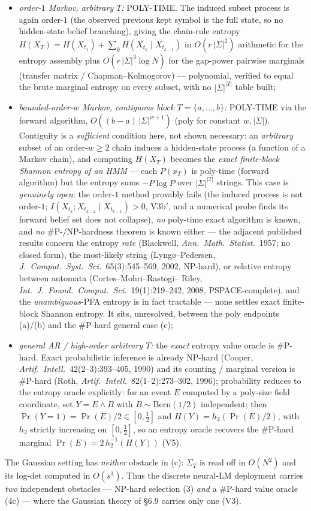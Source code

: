 \documentclass[
]{article}
\begin{document}
\begin{enumerate}
\begin{itemize}
\item[(a)] \emph{order-$1$ Markov, arbitrary $T$:} POLY-TIME. The induced
subset process is again order-$1$ (the observed previous kept symbol is the
full state, so no hidden-state belief branching), giving the chain-rule
entropy $H(X_T)=H(X_{t_1})+\sum_k H(X_{t_k}\mid X_{t_{k-1}})$ in $O(r\,
|\Sigma|^2)$ arithmetic for the entropy assembly plus $O(r\,|\Sigma|^3\log N)$
for the gap-power pairwise marginals (transfer matrix / Chapman--Kolmogorov)
--- polynomial, verified to equal the brute marginal entropy on
every subset, with no $|\Sigma|^{|T|}$ table built;
\item[(b)] \emph{bounded-order-$w$ Markov, \emph{contiguous} block
$T=\{a,\dots,b\}$:} POLY-TIME via the forward algorithm,
$O((b-a)\,|\Sigma|^{w+1})$ (poly for constant $w,|\Sigma|$). Contiguity is a
\emph{sufficient} condition here, not shown necessary: an \emph{arbitrary}
subset of an order-$w\ge 2$ chain induces a hidden-state process (a function of
a Markov chain), and computing $H(X_T)$ becomes the \emph{exact finite-block
Shannon entropy of an HMM} --- each $P(x_T)$ is poly-time (forward algorithm)
but the entropy sums $-P\log P$ over $|\Sigma|^{|T|}$ strings. This case is
\emph{genuinely open}: the order-$1$ method provably fails (the induced process
is not order-$1$; $I(X_{t_k};X_{t_{k-2}}\mid X_{t_{k-1}})>0$, V3b$'$, and a
numerical probe finds its forward belief set does not collapse), \emph{no}
poly-time exact algorithm is known, and \emph{no} \#P-/NP-hardness theorem is
known either --- the adjacent published results concern the entropy \emph{rate}
(Blackwell, \emph{Ann.\ Math.\ Statist.}\ 1957; no closed form), the most-likely
string (Lyng\o{}--Pedersen, \emph{J.\ Comput.\ Syst.\ Sci.}\ 65(3):545--569,
2002, NP-hard), or relative entropy between automata (Cortes--Mohri--Rastogi--
Riley, \emph{Int.\ J.\ Found.\ Comput.\ Sci.}\ 19(1):219--242, 2008,
PSPACE-complete), and the \emph{unambiguous}-PFA entropy is in fact tractable
--- none settles exact finite-block Shannon entropy. It sits, unresolved,
between the poly endpoints (a)/(b) and the \#P-hard general case (c);
\item[(c)] \emph{general AR / high-order arbitrary $T$:} the \emph{exact}
entropy value oracle is \#P-hard. Exact probabilistic inference is already NP-hard (Cooper,
\emph{Artif.\ Intell.}\ 42(2--3):393--405, 1990) and its counting / marginal
version is \#P-hard (Roth, \emph{Artif.\ Intell.}\ 82(1--2):273--302, 1996);
probability reduces to the entropy oracle explicitly: for an
event $E$ computed by a poly-size field coordinate, set $Y=E\wedge B$ with
$B\sim\mathrm{Bern}(1/2)$ independent; then $\Pr(Y{=}1)=\Pr(E)/2\in[0,\tfrac12]$
and $H(Y)=h_2(\Pr(E)/2)$, with $h_2$ strictly increasing on $[0,\tfrac12]$,
so an entropy oracle recovers the \#P-hard marginal $\Pr(E)=2\,h_2^{-1}(H(Y))$
(V5).
\end{itemize}
The Gaussian setting has \emph{neither} obstacle in (c): $\Sigma_T$ is read
off in $O(N^2)$ and its log-det computed in $O(s^3)$. Thus the discrete
neural-LM deployment carries \emph{two} independent obstacles --- NP-hard
selection (3) \emph{and} a \#P-hard value oracle (4c) --- where the Gaussian
theory of §6.9 carries only one (V3).
\end{enumerate}
\end{document}
